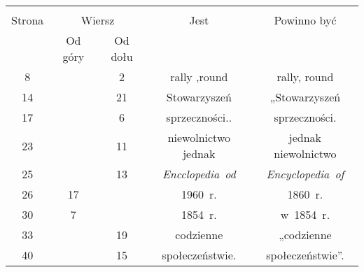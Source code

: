 \documentclass[a4paper,11pt]{article}
\begin{document}

\begin{center}

  \begin{tabular}{|c|c|c|c|c|}
    \hline
    & \multicolumn{2}{c|}{} & & \\
    Strona & \multicolumn{2}{c|}{Wiersz} & Jest
                              & Powinno być \\ \cline{2-3}
    & Od góry & Od dołu & & \\
    \hline
    8   & &  2 & rally ,round & rally, round \\
    14  & & 21 & Stowarzyszeń & „Stowarzyszeń \\
    17  & &  6 & sprzeczności.. & sprzeczności. \\
    23  & & 11 & niewolnictwo jednak & jednak niewolnictwo \\
    25  & & 13 & \emph{Encclopedia~od} & \emph{Encyclopedia~of} \\
    26  & 17 & & 1960~r. & 1860~r. \\
    30  &  7 & & 1854~r. & w~1854~r. \\
    33  & & 19 & codzienne & „codzienne \\
    40  & & 15 & społeczeństwie. & społeczeństwie”. \\
    \hline
  \end{tabular}




\end{center}
\end{document}
